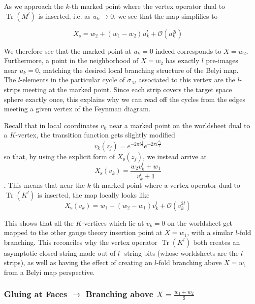 \documentclass[english]{article}
\DeclareMathOperator{\Tr}{Tr}
\renewcommand{\>}{\rangle}
\newcommand{\<}{\langle}
\renewcommand{\(}{\left(}
\renewcommand{\)}{\right)}
\begin{document}
As we approach the $k$-th marked point where the vertex operator dual to $\Tr(M^{l})$ is inserted, i.e. as $u_{k} \rightarrow 0$, we see that the map simplifies to

\begin{equation}
    X_{\text{s}} = w_{2} + (w_1-w_2)u_{k}^{l} + \mathcal{O}(u_{k}^{2l})
\end{equation}


We therefore see that the marked point at $u_{k}=0$ indeed corresponds to $X=w_2$. Furthermore, a point in the neighborhood of $X=w_2$ has exactly $l$ pre-images near $u_k=0$, matching the desired local branching structure of the Belyi map. The $l$-elements in the particular cycle of $\sigma_{M}$ associated to this vertex are the $l$-strips meeting at the marked point. Since each strip covers the target space sphere exactly once, this explains why we can read off the cycles from the edges meeting a given vertex of the Feynman diagram. 

Recall that in local coordinates $v_{k}$ near a marked point on the worldsheet dual to a $K$-vertex, the transition function gets slightly modified
\begin{equation}
    v_{k}(z_{j}) = e^{-2\pi i \frac{j}{l}}e^{-2 \pi i \frac{z_{j}}{l}}
\end{equation}
so that, by using the explicit form of $X_{\text{s}}(z_{j})$, we instead arrive at 
\begin{equation}
   X_{\text{s}}(v_{k})= \frac{w_{2}v_{k}^{l}+w_{1}}{v_{k}^{l}+1}
\end{equation}.
This means that near the $k$-th marked point where a vertex operator dual to $\Tr(K^{l})$ is inserted, the map locally looks like
\begin{equation}
    X_{\text{s}}(v_{k}) = w_{1} + (w_2-w_1)v_{k}^{l} + \mathcal{O}(v_{k}^{2l})
\end{equation}

This shows that all the $K$-vertices which lie at $v_{k}=0$ on the worldsheet get mapped to the other gauge theory insertion point at $X=w_1$, with a similar $l$-fold branching. This reconciles why the vertex operator $\Tr(K^{l})$ both creates an asymptotic closed string made out of $l$- string bits (whose worldsheets are the $l$ strips), as well as having the effect of creating an $l$-fold branching above $X=w_1$ from a Belyi map perspective.

\subsubsection*{Gluing at Faces $\rightarrow$ Branching above $X=\frac{w_1+w_2}{2}$}
\end{document}
